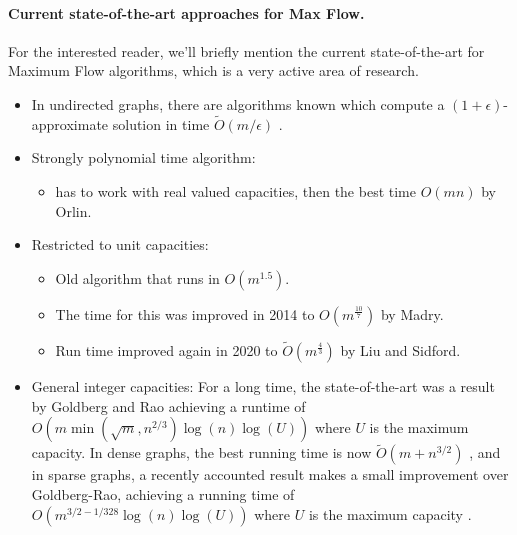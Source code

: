 \paragraph{Current state-of-the-art approaches for Max Flow.} For the
interested reader, we'll briefly mention the current state-of-the-art
for Maximum Flow algorithms, which is a  very active area of research.
\begin{itemize}
   \item In undirected graphs, there are algorithms known which
     compute a $(1+\epsilon)$-approximate solution in time
     $\tilde{O}(m/\epsilon)$ \cite{S17}.
    \item Strongly polynomial time algorithm:
     \begin{itemize}
       \item has to work with real valued capacities, then the best time $O(mn)$ by Orlin.
    \end{itemize}
    \item Restricted to unit capacities:
    \begin{itemize}
        \item Old algorithm that runs in \(O(m^{1.5})\).
        \item The time for this was improved in 2014 to
          \(O(m^{\frac{10}{7}} )\) by Madry.
        \item Run time improved again in 2020 to \(\tilde{O}(m^{\frac{4}{3}})\) by Liu and Sidford.
    \end{itemize}
  \item General integer capacities: For a long time, the
    state-of-the-art was a result by Goldberg and Rao achieving a
    runtime of \(O(m \min(\sqrt{m},n^{2/3}) \log(n) \log(U) )\) where $U$ is the
    maximum capacity.
    In dense graphs, the best running time is now $\tilde{O}(m +
    n^{3/2})$ \cite{BLLSSSW21}, and in sparse graphs, a recently
    accounted result makes a small improvement over Goldberg-Rao,
    achieving a running time of  \(O(m^{3/2 - 1/328} \log(n) \log(U) )\) where $U$ is the
    maximum capacity \cite{GLP21}.
\end{itemize}
%







